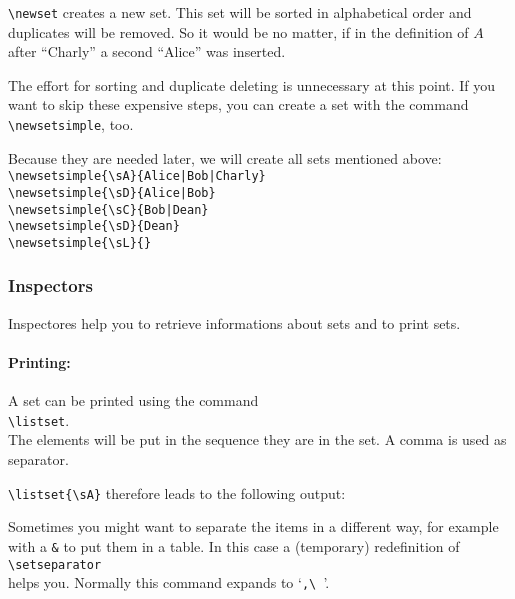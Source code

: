 \verb$\newset$ creates a new set. This set will be sorted in alphabetical order and duplicates will be removed. So it would be no matter, if in the definition of $A$ after ``Charly'' a second ``Alice'' was inserted.

The effort for sorting and duplicate deleting is unnecessary at this point. If you want to skip these expensive steps, you can create a set with the command
\verb$\newsetsimple$, too.

Because they are needed later, we will create all sets mentioned above:\\
\mbox{}\hspace{2em}\verb$\newsetsimple{\sA}{Alice|Bob|Charly}$ \\
\mbox{}\hspace{2em}\verb$\newsetsimple{\sD}{Alice|Bob}$ \\
\mbox{}\hspace{2em}\verb$\newsetsimple{\sC}{Bob|Dean}$ \\
\mbox{}\hspace{2em}\verb$\newsetsimple{\sD}{Dean}$ \\
\mbox{}\hspace{2em}\verb$\newsetsimple{\sL}{}$ \newsetsimple{\sL}{}
\subsubsection{Inspectors}\label{inspectors}
Inspectores help you to retrieve informations about sets and to print sets.

\paragraph{Printing:}A set can be printed using the command\\
\mbox{}\hspace{2em}\verb$\listset$.\\
The elements will be put in the sequence they are in the set. A comma is used as separator.

\verb$\listset{\sA}$ therefore leads to the following output:\\
\centerline{\listset{\sA}}

Sometimes you might want to separate the items in a different way, for example with a \texttt{\&} to put them in a table. In this case a (temporary) redefinition of\\
\mbox{}\hspace{2em}\verb$\setseparator$\\
helps you. Normally this command expands to `\verb*$,\ $'.

